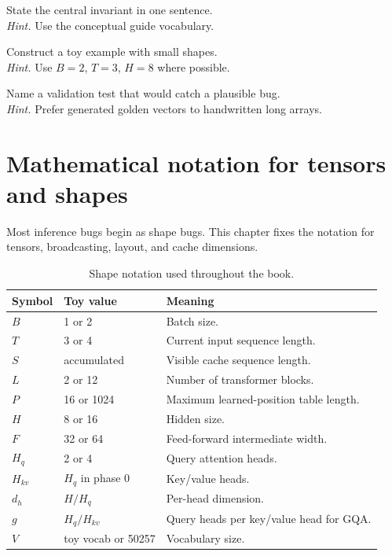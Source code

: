 \begin{chapterexercises}
\item State the central invariant in one sentence.\\
\textit{Hint.} Use the conceptual guide vocabulary.
\item Construct a toy example with small shapes.\\
\textit{Hint.} Use $B=2$, $T=3$, $H=8$ where possible.
\item Name a validation test that would catch a plausible bug.\\
\textit{Hint.} Prefer generated golden vectors to handwritten long arrays.
\end{chapterexercises}

\chapter{Mathematical notation for tensors and shapes}
\label{ch:tensors-shapes}
Most inference bugs begin as shape bugs. This chapter fixes the notation for tensors, broadcasting, layout, and cache dimensions.


\begin{table}[htbp]\centering\small
\begin{tabularx}{\textwidth}{L{0.20\textwidth}L{0.20\textwidth}Y}
\toprule
Symbol & Toy value & Meaning \\
\midrule
$B$ & 1 or 2 & Batch size. \\
$T$ & 3 or 4 & Current input sequence length. \\
$S$ & accumulated & Visible cache sequence length. \\
$L$ & 2 or 12 & Number of transformer blocks. \\
$P$ & 16 or 1024 & Maximum learned-position table length. \\
$H$ & 8 or 16 & Hidden size. \\
$F$ & 32 or 64 & Feed-forward intermediate width. \\
$H_q$ & 2 or 4 & Query attention heads. \\
$H_{kv}$ & $H_q$ in phase 0 & Key/value heads. \\
$d_h$ & $H/H_q$ & Per-head dimension. \\
$g$ & $H_q/H_{kv}$ & Query heads per key/value head for GQA. \\
$V$ & toy vocab or 50257 & Vocabulary size. \\
\bottomrule
\end{tabularx}
\caption{Shape notation used throughout the book.}
\end{table}


